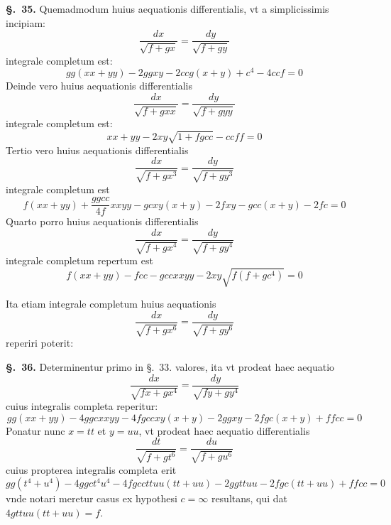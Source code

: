 \documentclass{article}
\begin{document}
\textbf{§.~35.} Quemadmodum huius aequationis differentialis, vt a simplicissimis incipiam:
\[ \frac{dx}{\sqrt{f + gx}} = \frac{dy}{\sqrt{f + gy}} \]
integrale completum est:
\[ gg(xx + yy) - 2ggxy - 2ccg(x+y) + c^{4} - 4ccf = 0 \]
Deinde vero huius aequationis differentialis
\[ \frac{dx}{\sqrt{f + gxx}} = \frac{dy}{\sqrt{f + gyy}} \]
integrale completum est:
\[ xx + yy - 2xy\sqrt{1 + fgcc} - ccff = 0 \]
Tertio vero huius aequationis differentialis
\[ \frac{dx}{\sqrt{f + gx^{3}}} = \frac{dy}{\sqrt{f + gy^{3}}} \]
integrale completum est
\[ f(xx + yy) + \frac{ggcc}{4f}xxyy - gcxy(x+y) - 2fxy - gcc(x+y) - 2fc = 0 \]
Quarto porro huius aequationis differentialis
\[ \frac{dx}{\sqrt{f + gx^{4}}} = \frac{dy}{\sqrt{f + gy^{4}}} \]
integrale completum repertum est
\[ f(xx + yy) - fcc - gccxxyy - 2xy\sqrt{f(f + gc^{4})} = 0 \]

Ita etiam integrale completum huius aequationis
\[ \frac{dx}{\sqrt{f + gx^{6}}} = \frac{dy}{\sqrt{f + gy^{6}}} \]
reperiri poterit:

\textbf{§.~36.} Determinentur primo in §.~33. valores, ita vt prodeat haec aequatio
\[ \frac{dx}{\sqrt{fx + gx^{4}}} = \frac{dy}{\sqrt{fy + gy^{4}}} \]
cuius integralis completa reperitur:
\[ gg(xx + yy) - 4ggcxxyy - 4fgccxy(x+y) - 2ggxy - 2fgc(x+y) + ffcc = 0 \]
Ponatur nunc $x = tt$ et $y = uu$, vt prodeat haec aequatio differentialis
\[ \frac{dt}{\sqrt{f + gt^{6}}} = \frac{du}{\sqrt{f + gu^{6}}} \]
cuius propterea integralis completa erit
\[ gg(t^{4} + u^{4}) - 4ggct^{4}u^{4} - 4fgccttuu(tt+uu) - 2ggttuu - 2fgc(tt+uu) + ffcc = 0 \]
vnde notari meretur casus ex hypothesi $c = \infty$ resultans, qui dat $4gttuu(tt+uu) = f$.
\end{document}
